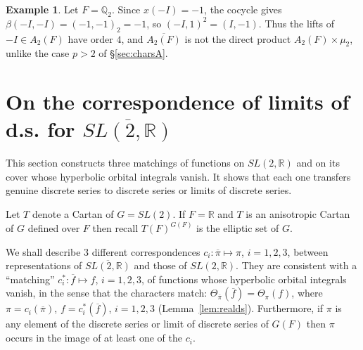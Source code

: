 \documentclass[12pt,letterpaper,openany]{book}
\theoremstyle{plain}
\theoremstyle{definition}
\newtheorem{example}[theorem]{Example}
\theoremstyle{remark}
\theoremstyle{remark}
\begin{document}



\begin{example}
Let $F={\mathbb Q}_2$. Since $x(-I)=-1$, the cocycle gives
$\beta(-I,-I)=(-1,-1)_2=-1$, so $(-I,1)^2=(I,-1)$. Thus the lifts of
$-I\in A_2(F)$ have order $4$, and $\overline{A_2(F)}$ is not the direct
product $A_2(F)\times\mu_2$, unlike the case $p>2$ of \S\ref{sec:charsA}.
\end{example}

\section{On the correspondence of limits of d.s. for
\texorpdfstring{$\overline{SL(2,\mathbb{R})}$}{SL(2,R)-bar}}\label{sec:realds}

This section constructs three matchings of functions on $SL(2,{\mathbb R})$ and on its cover whose hyperbolic orbital integrals vanish. It shows that each one transfers genuine discrete series to discrete series or limits of discrete series.


Let $T$ denote a Cartan of $G=SL(2)$.
If $F={\mathbb{R}}$ and $T$ is an
anisotropic Cartan of $G$ defined over $F$ then recall $T(F)^{G(F)}$ is the
elliptic set of $G$.

We shall describe 3 different correspondences
$c_i:\overline{\pi}\longmapsto \pi$, $i=1,2,3$, between representations of
$\overline{SL(2,\mathbb{R})}$ and those of $SL(2,\mathbb{R})$. They are
consistent with a ``matching'' $c_i^*:\overline{f}\longmapsto f$,
$i=1,2,3$, of functions whose hyperbolic orbital integrals vanish, in the
sense that the characters match:
$\Theta_{\overline{\pi}}(\overline{f})=\Theta_{\pi}(f)$, where
$\pi=c_i(\overline{\pi})$, $f=c_i^*(\overline{f})$, $i=1,2,3$
(Lemma~\ref{lem:realds}).
Furthermore, if $\pi$ is any element of the discrete series or limit of
discrete series of $G(F)$ then $\pi$ occurs in the image of at least one
of the $c_i$.
\end{document}
